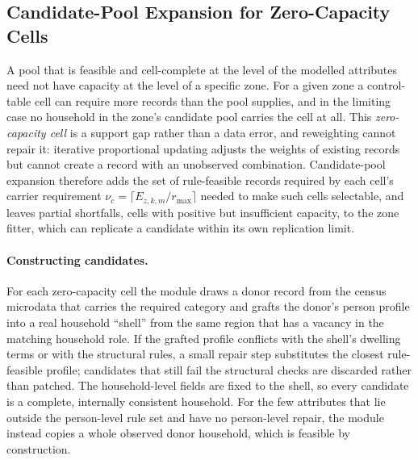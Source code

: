 ﻿\subsection{Candidate-Pool Expansion for Zero-Capacity Cells}
\label{sec:mip_pool_expansion}

A pool that is feasible and cell-complete at the level of the modelled
attributes need not have capacity at the level of a specific zone. For a given
zone a control-table cell can require more records than the pool supplies, and
in the limiting case no household in the zone's candidate pool carries the cell
at all. This \emph{zero-capacity cell} is a support gap rather than a data
error, and reweighting cannot repair it: iterative proportional updating adjusts
the weights of existing records but cannot create a record with an unobserved
combination. Candidate-pool expansion therefore adds the set of rule-feasible
records required by each cell's carrier requirement $\nu_c=\lceil E_{z,k,m}/r_{\max}\rceil$
needed to make such cells selectable, and leaves partial
shortfalls, cells with positive but insufficient capacity, to the zone fitter,
which can replicate a candidate within its own replication limit.

\paragraph{Constructing candidates.}
For each zero-capacity cell the module draws a donor record from the census
microdata that carries the required category and grafts the donor's person
profile into a real household ``shell'' from the same region that has a vacancy
in the matching household role. If the grafted profile conflicts with the
shell's dwelling terms or with the structural rules, a small repair step
substitutes the closest rule-feasible profile; candidates that still fail the
structural checks are discarded rather than patched. The household-level fields
are fixed to the shell, so every candidate is a complete, internally consistent
household. For the few attributes that lie outside the person-level rule set and
have no person-level repair, the module instead copies a whole observed donor
household, which is feasible by construction.

